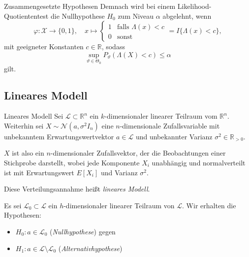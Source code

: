 \begin{defi}{Zusammengesetzte Hypothesen}
    Demnach wird bei einem Likelihood-Quotiententest die Nullhypothese $H_0$ zum Niveau $\alpha$ abgelehnt, wenn
    \[
        \varphi: \mathcal{X} \to \{ 0, 1 \}, \quad x \mapsto \begin{cases}
            1 & \text{falls } \Lambda(x) < c \\
            0 & \text{sonst}
        \end{cases}
        = I \{ \Lambda(x) < c \},
    \]
    mit geeigneter Konstanten $c \in \mathbb{R}$, sodass
    \[
        \sup_{\vartheta \in \Theta_0} P_{\vartheta}(\Lambda(X) < c) \leq \alpha
    \]
    gilt.
\end{defi}

\subsection{Lineares Modell}

\begin{defi}{Lineares Modell}
    Sei $\mathcal{L} \subset \mathbb{R}^n$ ein $k$-dimensionaler linearer Teilraum vom $\mathbb{R}^n$.
    Weiterhin sei $X \sim \mathcal{N}(a, \sigma^2 I_n)$ eine $n$-dimensionale Zufallsvariable mit unbekanntem Erwartungswertvektor $a \in \mathcal{L}$ und unbekannter Varianz $\sigma^2 \in \mathbb{R}_{> 0}$.

    $X$ ist also ein $n$-dimensionaler Zufallsvektor, der die Beobachtungen einer Stichprobe darstellt, wobei jede Komponente $X_i$ unabhängig und normalverteilt ist mit Erwartungswert $E[X_i]$ und Varianz $\sigma^2$.

    Diese Verteilungsannahme heißt \emph{lineares Modell}.


    Es sei $\mathcal{L}_0 \subset \mathcal{L}$ ein $h$-dimensionaler linearer Teilraum von $\mathcal{L}$.
    Wir erhalten die Hypothesen:
    \begin{itemize}
        \item $H_0: a \in \mathcal{L}_0$ (\emph{Nullhypothese}) gegen
        \item $H_1: a \in \mathcal{L} \setminus \mathcal{L}_0$ (\emph{Alternativhypothese})
    \end{itemize}
\end{defi}

